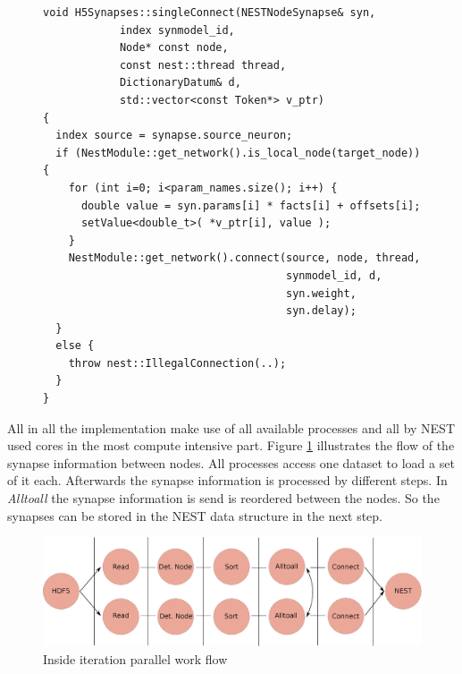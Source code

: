 \begin{figure}[ht!]
\begin{lstlisting}[style=cppcode]
void H5Synapses::singleConnect(NESTNodeSynapse& syn, 
    		index synmodel_id,
    		Node* const node,
    		const nest::thread thread,
    		DictionaryDatum& d, 
    		std::vector<const Token*> v_ptr)
{
  index source = synapse.source_neuron;
  if (NestModule::get_network().is_local_node(target_node)) { 
    for (int i=0; i<param_names.size(); i++) {
      double value = syn.params[i] * facts[i] + offsets[i];
      setValue<double_t>( *v_ptr[i], value );
    }
    NestModule::get_network().connect(source, node, thread,
                                      synmodel_id, d,
                                      syn.weight,
                                      syn.delay);
  }
  else {
    throw nest::IllegalConnection(..);
  }
}
\end{lstlisting}
\caption{}
\end{figure}

\newpage
All in all the implementation make use of all available processes and all by NEST used cores in the most compute intensive part.
Figure \ref{fig:ConnectInsideIteration} illustrates the flow of the synapse information between nodes. 
All processes access one dataset to load a set of it each. Afterwards the synapse information is processed by different steps.
In \emph{Alltoall} the synapse information is send is reordered between the nodes.
So the synapses can be stored in the NEST data structure in the next step.
\begin{figure}[ht!]
\centering
\includegraphics[scale=0.4]{pictures/Connect_inside_iteration.eps}
\caption{Inside iteration parallel work flow}
\label{fig:ConnectInsideIteration}
\end{figure}

\newpage
